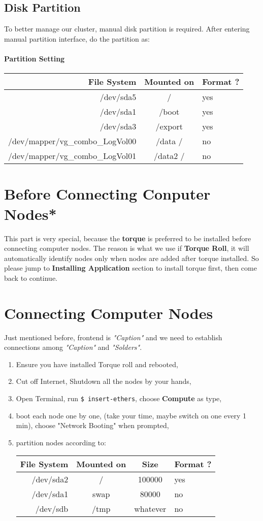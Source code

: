 \subsection{Disk Partition}
To better manage our cluster, manual disk partition is required. After entering manual partition interface, do the partition as:
\paragraph{Partition Setting}
\begin{tabular}{ r | c | l }
	\hline
		File System & Mounted on & Format ? \\ \hline
		/dev/sda5 & / & yes \\ \hline
		/dev/sda1 & /boot & yes \\ \hline
		/dev/sda3 & /export & yes \\ \hline
		/dev/mapper/vg\_combo\_LogVol00 & /data / & no \\ \hline
		/dev/mapper/vg\_combo\_LogVol01 & /data2 / & no \\
	\hline
\end{tabular}

\section{Before Connecting Conputer Nodes*}
This part is very special, because the {\bf torque} is preferred to be installed before connecting computer nodes. The reason is what we use if {\bf Torque Roll}, it will automatically identify nodes only when nodes are added after torque installed. So please jump to {\bf Installing Application} section to install torque first, then come back to continue.

\section{Connecting Computer Nodes}
Just mentioned before, frontend is {\it "Caption"} and we need to establish connections among {\it "Caption"} and {\it "Solders"}.
\begin{enumerate}
\item Ensure you have installed Torque roll and rebooted,
\item Cut off Internet, Shutdown all the nodes by your hands,
\item Open Terminal, run {\tt \$ insert-ethers}, choose {\bf Compute} as type,
\item boot each node one by one, (take your time, maybe switch on one every 1 min), choose "Network Booting" when prompted,
\item partition nodes according to: \\
\begin{tabular}{ r | c | c | l }
	\hline
		File System & Mounted on & Size & Format ? \\ \hline
		/dev/sda2 & / & 100000 & yes \\ \hline
		/dev/sda1 & swap & 80000 & no \\ \hline
		/dev/sdb & /tmp & whatever & no \\
	\hline
\end{tabular}
\end{enumerate}


